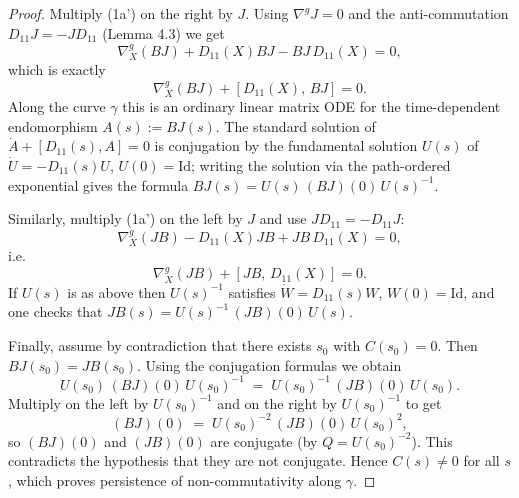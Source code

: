 \begin{proof}
Multiply (1a') on the right by $J$. Using $\nabla^g J=0$ and the
anti-commutation $D_{11}J=-J D_{11}$ (Lemma 4.3) we get
\[
\nabla^g_X(BJ) + D_{11}(X)BJ - BJ\,D_{11}(X) = 0,
\]
which is exactly
\[
\nabla^g_X(BJ) + [D_{11}(X),\,BJ] = 0.
\]
Along the curve $\gamma$ this is an ordinary linear matrix ODE for the
time-dependent endomorphism $A(s):=BJ(s)$. The standard solution of
$\dot A + [D_{11}(s),A]=0$ is conjugation by the fundamental solution
$U(s)$ of $\dot U=-D_{11}(s)U$, $U(0)=\mathrm{Id}$; writing the solution
via the path-ordered exponential gives the formula
$BJ(s)=U(s)\,(BJ)(0)\,U(s)^{-1}$.

Similarly, multiply (1a') on the left by $J$ and use $J D_{11} = - D_{11} J$:
\[
\nabla^g_X(JB) - D_{11}(X)JB + JB\,D_{11}(X) = 0,
\]
i.e.
\[
\nabla^g_X(JB) + [JB,\,D_{11}(X)] = 0.
\]
If $U(s)$ is as above then $U(s)^{-1}$ satisfies $\dot W = D_{11}(s)W$,
$W(0)=\mathrm{Id}$, and one checks that
$JB(s)=U(s)^{-1}\,(JB)(0)\,U(s)$.

Finally, assume by contradiction that there exists $s_0$ with $C(s_0)=0$.
Then $BJ(s_0)=JB(s_0)$. Using the conjugation formulas we obtain
\[
U(s_0)\,(BJ)(0)\,U(s_0)^{-1} \;=\; U(s_0)^{-1}\,(JB)(0)\,U(s_0).
\]
Multiply on the left by $U(s_0)^{-1}$ and on the right by $U(s_0)^{-1}$ to get
\[
(BJ)(0) \;=\; U(s_0)^{-2}\,(JB)(0)\,U(s_0)^{2},
\]
so $(BJ)(0)$ and $(JB)(0)$ are conjugate (by $Q=U(s_0)^{-2}$). This contradicts
the hypothesis that they are not conjugate. Hence $C(s)\neq0$ for all $s$,
which proves persistence of non-commutativity along $\gamma$.
\end{proof}























